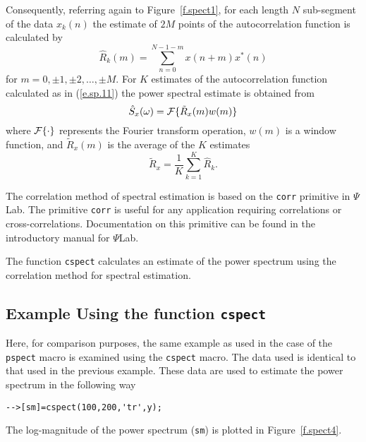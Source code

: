 	Consequently, referring again to Figure~\ref{f.spect1},
for each length $N$ sub-segment of the data $x_k(n)$ the estimate
of $2M$ points of the autocorrelation function is calculated by
%
\begin{equation}
\hat{R}_k(m)=\sum_{n=0}^{N-1-m}x(n+m)x^*(n)
\label{e.sp.11}
\end{equation}
%
for $m=0,\pm1,\pm2,\ldots,\pm M$.  For $K$ estimates of the autocorrelation 
function calculated as in (\ref{e.sp.11}) the power spectral estimate is
obtained from
%
\begin{equation}
\hat{S}_x(\omega)={\cal F}\{\tilde{R}_x(m)w(m)\}
\label{e.sp.12}
\end{equation}
%
where ${\cal F}\{\cdot\}$ represents the Fourier transform operation,
$w(m)$ is a window function, and $\tilde{R}_x(m)$ is the
average of the $K$ estimates
%
\begin{equation}
\tilde{R}_x=\frac{1}{K}\sum_{k=1}^{K}\hat{R}_k.
\label{e.sp.13}
\end{equation}
%

	The correlation method of spectral estimation is based
on the {\tt corr} primitive in $\Psi$Lab.  The primitive {\tt corr}
is useful for any application requiring correlations or cross-correlations.
Documentation on this primitive can be found in the introductory
manual for $\Psi$Lab.

The function {\tt cspect} calculates an estimate of
the power spectrum using the correlation method for spectral estimation.

\subsection{Example Using the function {\tt cspect}}

	Here, for comparison purposes, the same example as used in
the case of the {\tt pspect} macro is examined using the {\tt cspect}
macro.  The data used is identical
to that used in the previous example.  These data 
are used to estimate the power spectrum
in the following way
\begin{verbatim}
-->[sm]=cspect(100,200,'tr',y);
\end{verbatim}
The log-magnitude of the power spectrum ({\tt sm}) is plotted in
Figure~\ref{f.spect4}.  

